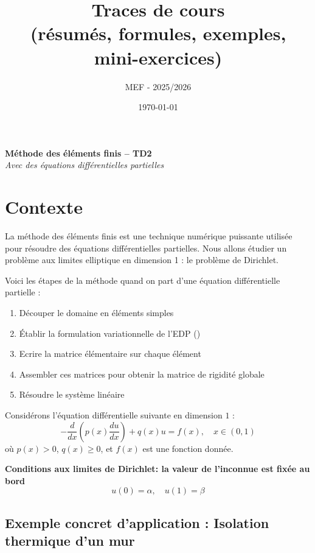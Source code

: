 \documentclass[11pt,a4paper]{report}
\title{\textbf{Traces de cours}\\\large (résumés, formules, exemples, mini-exercices)}
\author{ MEF - 2025/2026 }
\date{\today}
\begin{document}
\begin{center}
    {\LARGE \textbf{Méthode des éléments finis -- TD2}}\\[1em]
    {\large \textit{Avec des équations différentielles partielles}}
\end{center}
\section*{Contexte}
La méthode des éléments finis est une technique numérique puissante utilisée pour résoudre des équations différentielles partielles. Nous allons étudier un problème aux limites elliptique en dimension 1 : le problème de Dirichlet. 

Voici les étapes de la méthode quand on part d'une équation différentielle partielle :
\begin{enumerate}
    \item Découper le domaine en éléments simples
    \item Établir la formulation variationnelle de l'EDP ()
    \item Ecrire la matrice élémentaire sur chaque élément
    \item Assembler ces matrices pour obtenir la matrice de rigidité globale
    \item Résoudre le système linéaire
\end{enumerate}


Considérons l'équation différentielle suivante en dimension $1$ :
\[
- \frac{d}{dx} \left( p(x) \frac{du}{dx} \right) + q(x) u = f(x), \quad x \in (0, 1)
\]
où \( p(x) > 0 \), \( q(x) \geq 0 \), et \( f(x) \) est une fonction donnée.

\textbf{Conditions aux limites de Dirichlet: la valeur de l'inconnue est fixée au bord}
\[
u(0) = \alpha, \quad u(1) = \beta
\]

\subsection*{Exemple concret d'application : Isolation thermique d'un mur}
\end{document}
